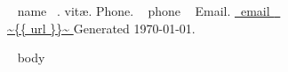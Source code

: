 \documentclass[letter]{article}
\begin{document}
{\huge ~{{ name }}~. vit\ae.} \hfill
{Phone.} {\small ~{{ phone }}~} \hspace{2mm}
{Email.} {\small \href{mailto: ~{{ email }}~ }{ ~{{email }}~ }} \\
\url{ ~{{ url }}~ } \hfill Generated \today.
\vspace{3mm}

~{{ body }}~
\end{document}
